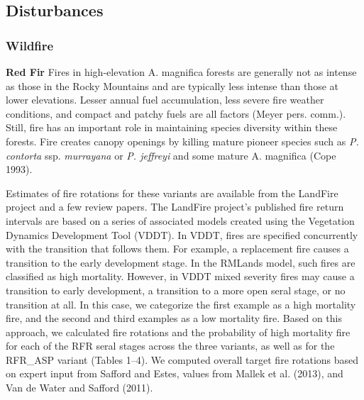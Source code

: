 \subsection*{Disturbances}

\subsubsection{Wildfire}

\textbf{Red Fir} Fires in high-elevation A. magnifica forests are generally not as intense as those in the Rocky Mountains and are typically less intense than those at lower elevations. Lesser annual fuel accumulation, less severe fire weather conditions, and compact and patchy fuels are all factors (Meyer pers. comm.). Still, fire has an important role in maintaining species diversity within these forests. Fire creates canopy openings by killing mature pioneer species such as \emph{P. contorta} ssp. \emph{murrayana} or \emph{P. jeffreyi} and some mature A. magnifica (Cope 1993). 

Estimates of fire rotations for these variants are available from the LandFire project and a few review papers. The LandFire project’s published fire return intervals are based on a series of associated models created using the Vegetation Dynamics Development Tool (VDDT). In VDDT, fires are specified concurrently with the transition that follows them. For example, a replacement fire causes a transition to the early development stage. In the RMLands model, such fires are classified as high mortality. However, in VDDT mixed severity fires may cause a transition to early development, a transition to a more open seral stage, or no transition at all. In this case, we categorize the first example as a high mortality fire, and the second and third examples as a low mortality fire. Based on this approach, we calculated fire rotations and the probability of high mortality fire for each of the RFR seral stages across the three variants, as well as for the RFR\_ASP variant (Tables 1–4). We computed overall target fire rotations based on expert input from Safford and Estes, values from Mallek et al. (2013), and Van de Water and Safford (2011). 





